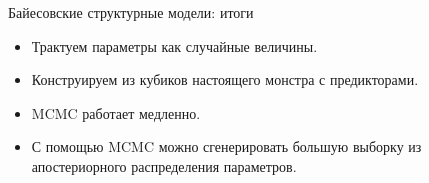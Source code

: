   




\begin{frame}{Байесовские структурные модели: итоги}

  \begin{itemize}[<+->]
    \item Трактуем параметры как \alert{случайные величины}. 
    \item Конструируем из кубиков \alert{настоящего монстра} с предикторами.
    \item MCMC работает \alert{медленно}.
    \item С помощью MCMC можно сгенерировать большую выборку 
    из \alert{апостериорного} распределения параметров. 

  \end{itemize}
\end{frame}

